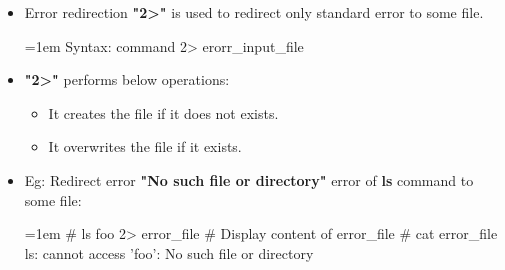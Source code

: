 \setlength{\columnsep}{3pt}
\begin{flushleft}
	\begin{itemize}
		\item Error redirection \textbf{"2>"} is used to redirect only standard error to some file.	
		\bigskip
		\begin{tcolorbox}[breakable,notitle,boxrule=-0pt,colback=pink,colframe=pink]
			\color{black}
			\font=1em
			Syntax: command 2> erorr\_input\_file
			\font=4pt
		\end{tcolorbox}
		\item \textbf{"2>"} performs below operations:
		\begin{itemize}
			\item It creates the file if it does not exists.
			\item It overwrites the file if it exists.
		\end{itemize}
		\item Eg: Redirect error \textbf{"No such file or directory"} error of \textbf{ls} command to some file:
		\bigskip
		\begin{tcolorbox}[breakable,notitle,boxrule=-0pt,colback=black,colframe=black]
			\color{green}
			\font=1em
			\# ls foo 2> error\_file
			\newline
			\newline
			\color{yellow}
			\# Display content of error\_file
			\color{green}
			\newline
			\# cat error\_file
			\newline
			\color{white}
			ls: cannot access 'foo': No such file or directory
			\font=4pt
			
			\font=4pt
		\end{tcolorbox}

	\end{itemize}
	
	
\end{flushleft}

\newpage
